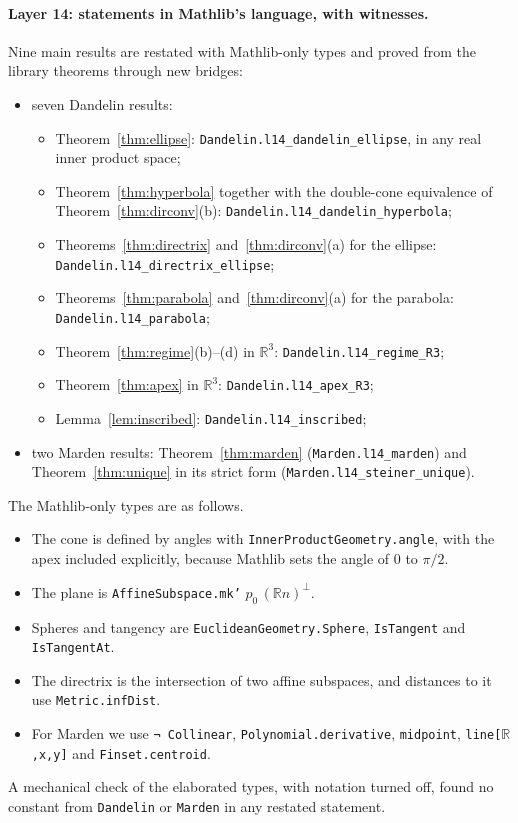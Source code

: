 \documentclass[11pt]{article}
\theoremstyle{remark}
\newcommand{\lean}[1]{\texttt{#1}}
\newcommand{\R}{\mathbb{R}}
\begin{document}
\paragraph{Layer 14: statements in Mathlib's language, with witnesses.} Nine main results are
restated with Mathlib-only types and proved from the library theorems through new bridges:
\begin{itemize}
\item seven Dandelin results:
  \begin{itemize}
  \item Theorem~\ref{thm:ellipse}: \lean{Dandelin.l14\_dandelin\_ellipse}, in any real inner
  product space;
  \item Theorem~\ref{thm:hyperbola} together with the double-cone equivalence of
  Theorem~\ref{thm:dirconv}(b): \lean{Dandelin.l14\_dandelin\_hyperbola};
  \item Theorems~\ref{thm:directrix} and~\ref{thm:dirconv}(a) for the ellipse:
  \lean{Dandelin.l14\_directrix\_ellipse};
  \item Theorems~\ref{thm:parabola} and~\ref{thm:dirconv}(a) for the parabola:
  \lean{Dandelin.l14\_parabola};
  \item Theorem~\ref{thm:regime}(b)--(d) in $\R^3$: \lean{Dandelin.l14\_regime\_R3};
  \item Theorem~\ref{thm:apex} in $\R^3$: \lean{Dandelin.l14\_apex\_R3};
  \item Lemma~\ref{lem:inscribed}: \lean{Dandelin.l14\_inscribed};
  \end{itemize}
\item two Marden results: Theorem~\ref{thm:marden} (\lean{Marden.l14\_marden}) and
Theorem~\ref{thm:unique} in its strict form (\lean{Marden.l14\_steiner\_unique}).
\end{itemize}
The Mathlib-only types are as follows.
\begin{itemize}
\item The cone is defined by angles with \lean{InnerProductGeometry.angle}, with the apex
included explicitly, because Mathlib sets the angle of $0$ to $\pi/2$.
\item The plane is \lean{AffineSubspace.mk'} $p_0\,(\R n)^\perp$.
\item Spheres and tangency are \lean{EuclideanGeometry.Sphere}, \lean{IsTangent} and
\lean{IsTangentAt}.
\item The directrix is the intersection of two affine subspaces, and distances to it use
\lean{Metric.infDist}.
\item For Marden we use \lean{¬ Collinear}, \lean{Polynomial.derivative}, \lean{midpoint},
\lean{line[$\R$,x,y]} and \lean{Finset.centroid}.
\end{itemize}
A mechanical check of the elaborated types, with notation turned off, found no constant from
\lean{Dandelin} or \lean{Marden} in any restated statement.
\end{document}
